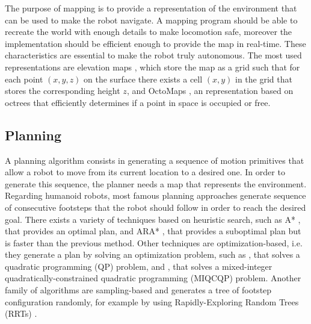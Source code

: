 The purpose of mapping is to provide a representation of the environment that
can be used to make the robot navigate. A mapping program should be able to
recreate the world with enough details to make locomotion safe, moreover
the implementation should be efficient enough to provide the map in real-time.
These characteristics are essential to make the robot truly autonomous.
The most used representations are elevation maps
\cite{Siciliano2016HandbookRobotics}, which store the map as a grid such that
for each point $(x, y, z)$ on the surface there exists a cell $(x, y)$ in the 
grid that stores the corresponding height $z$, and OctoMaps
\cite{Hornung2013OctoMap}, an representation based on octrees that efficiently
determines if a point in space is occupied or free.

\subsection{Planning}
A planning algorithm consists in generating a sequence of motion primitives
that allow a robot to move from its current location to a desired one. In
order to generate this sequence, the planner needs a map that represents
the environment. Regarding humanoid robots, most famous planning approaches
generate sequence of consecutive footsteps that the robot should follow in order
to reach the desired goal. There exists a variety of techniques based on
heuristic search, such as A* \cite{Chestnutt2005FootstepPlanningASIMO}, that
provides an optimal plan, and ARA*
\cite{Hornung2012AnytimeSearchBasedFootstepPlanning}, that provides a suboptimal
plan but is faster than the previous method. Other techniques are 
optimization-based, i.e. they generate a plan by solving an optimization 
problem, such as \cite{Herdt2010OnlineWalkingMotionGenerationWithAFSP}, that
solves a quadratic programming (QP) problem, and
\cite{Deits2015FootstepPlanningUnevenTerrainMIQCQP}, that solves a 
mixed-integer quadratically-constrained quadratic programming (MIQCQP) problem.
Another family of algorithms are sampling-based and generates a tree of 
footstep configuration randomly, for example by using Rapidly-Exploring
Random Trees (RRTs) \cite{ECC19}.

